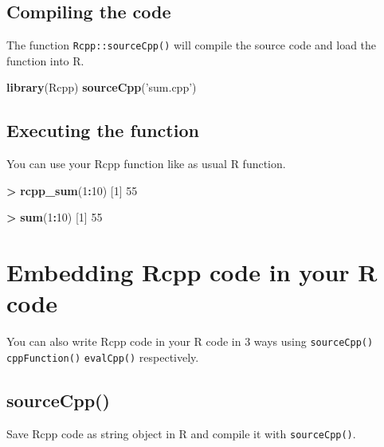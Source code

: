 \documentclass[]{book}
\newenvironment{Shaded}{\begin{snugshade}}{\end{snugshade}}
\newcommand{\KeywordTok}[1]{\textcolor[rgb]{0.13,0.29,0.53}{\textbf{#1}}}
\newcommand{\DecValTok}[1]{\textcolor[rgb]{0.00,0.00,0.81}{#1}}
\newcommand{\StringTok}[1]{\textcolor[rgb]{0.31,0.60,0.02}{#1}}
\newcommand{\OperatorTok}[1]{\textcolor[rgb]{0.81,0.36,0.00}{\textbf{#1}}}
\newcommand{\NormalTok}[1]{#1}
\theoremstyle{definition}
\theoremstyle{definition}
\theoremstyle{remark}
\begin{document}
\section{Compiling the code}\label{compiling-the-code}

The function \texttt{Rcpp::sourceCpp()} will compile the source code and
load the function into R.

\begin{Shaded}
\begin{Highlighting}[]
\KeywordTok{library}\NormalTok{(Rcpp)}
\KeywordTok{sourceCpp}\NormalTok{(}\StringTok{'sum.cpp'}\NormalTok{)}
\end{Highlighting}
\end{Shaded}

\section{Executing the function}\label{executing-the-function}

You can use your Rcpp function like as usual R function.

\begin{Shaded}
\begin{Highlighting}[]
\OperatorTok{>}\StringTok{ }\KeywordTok{rcpp_sum}\NormalTok{(}\DecValTok{1}\OperatorTok{:}\DecValTok{10}\NormalTok{)}
\NormalTok{[}\DecValTok{1}\NormalTok{] }\DecValTok{55}

\OperatorTok{>}\StringTok{ }\KeywordTok{sum}\NormalTok{(}\DecValTok{1}\OperatorTok{:}\DecValTok{10}\NormalTok{)}
\NormalTok{[}\DecValTok{1}\NormalTok{] }\DecValTok{55}
\end{Highlighting}
\end{Shaded}

\chapter{Embedding Rcpp code in your R
code}\label{embedding-rcpp-code-in-your-r-code}

You can also write Rcpp code in your R code in 3 ways using
\texttt{sourceCpp()} \texttt{cppFunction()} \texttt{evalCpp()}
respectively.

\section{sourceCpp()}\label{sourcecpp}

Save Rcpp code as string object in R and compile it with
\texttt{sourceCpp()}.
\end{document}
